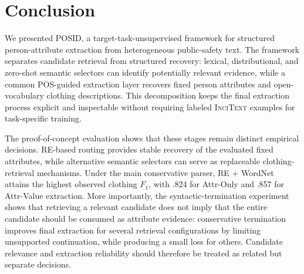 \documentclass[sigconf,nonacm]{acmart}
\newcommand{\posid}{\textsc{POSID}}
\newcommand{\incitext}{\textsc{InciText}}
\begin{document}

\section{Conclusion}
\label{sec:conclusion}

We presented \posid{}, a target-task-unsupervised framework for structured
person-attribute extraction from heterogeneous public-safety text. The
framework separates candidate retrieval from structured recovery: lexical,
distributional, and zero-shot semantic selectors can identify potentially
relevant evidence, while a common POS-guided extraction layer recovers fixed
person attributes and open-vocabulary clothing descriptions. This decomposition
keeps the final extraction process explicit and inspectable without requiring
labeled \incitext{} examples for task-specific training.

The proof-of-concept evaluation shows that these stages remain distinct
empirical decisions. RE-based routing provides stable recovery of the evaluated
fixed attributes, while alternative semantic selectors can serve as replaceable
clothing-retrieval mechanisms. Under the main conservative parser, RE + WordNet
attains the highest observed clothing $F_1$, with .824 for Attr-Only and .857 for
Attr-Value extraction. More importantly, the syntactic-termination experiment
shows that retrieving a relevant candidate does not imply that the entire
candidate should be consumed as attribute evidence: conservative termination
improves final extraction for several retrieval configurations by limiting
unsupported continuation, while producing a small loss for others. Candidate
relevance and extraction reliability should therefore be treated as related but
separate decisions.
\end{document}
